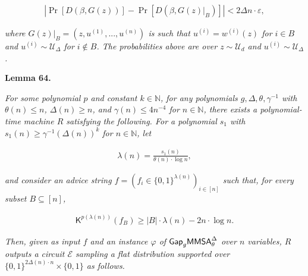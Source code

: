 \documentclass[10pt,a4paper]{article}
\begin{document}
\[\begin{gathered}
\left|\Pr\left[D(\beta,G(z))\right]-\Pr\left[D(\beta,G(z)|_{B})\right]\right|<2\Delta n\cdot\varepsilon,
\end{gathered}\]


\emph{where $G(z)|_{B}=(z,u^{(1)},...,u^{(n)})$ is such that $u^{(i)}=w^{(i)}(z)$ for $i\in B$ and $u^{(i)}\sim\mathcal{U}_{\Delta}$ for $i\notin B$. The probabilities above are over $z\sim\mathcal{U}_{d}$ and $u^{(i)}\sim\mathcal{U}_{\Delta}$.}\par







\par\medskip\noindent\textbf{
\textbf{Lemma 64}\textbf{.}
}\par



\emph{For some polynomial $p$ and constant $k\in\mathbb{N}$, for any polynomials $g,\Delta,\theta,\gamma^{-1}$ with $\theta(n)\leq n$, $\Delta(n)\geq n$, and $\gamma(n)\leq 4n^{-4}$ for $n\in\mathbb{N}$, there exists a polynomial-time machine $R$ satisfying the following. For a polynomial $s_{1}$ with $s_{1}(n)\geq\gamma^{-1}(\Delta(n))^{k}$ for $n\in\mathbb{N}$, let}\par


\[\begin{gathered}
\lambda(n)=\frac{s_{1}(n)}{\theta(n)\cdot\log n},
\end{gathered}\]


\emph{and consider an advice string $f=(f_{i}\in\{0,1\}^{\lambda(n)})_{i\in[n]}$ such that, for every subset $B\subseteq[n]$,}\par


\[\begin{gathered}
{\mathsf{K}}^{p(\lambda(n))}(f_{B})\geq|B|\cdot\lambda(n)-2n\cdot\log n.
\end{gathered}\]


\emph{Then, given as input $f$ and an instance $\varphi$ of ${\sf Gap}_{g}{\mathsf{MMSA}}^{\Delta}_{\theta}$ over $n$ variables, $R$ outputs a circuit $\mathcal{E}$ sampling a flat distribution supported over $\{0,1\}^{2\Delta(n)\cdot n}\times\{0,1\}$ as follows.}\par
\end{document}
